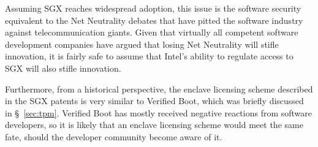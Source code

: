 Assuming SGX reaches widespread adoption, this issue is the software security
equivalent to the Net Neutrality debates that have pitted the software industry
against telecommunication giants. Given that virtually all competent software
development companies have argued that losing Net Neutrality will stifle
innovation, it is fairly safe to assume that Intel's ability to regulate access
to SGX will also stifle innovation.

Furthermore, from a historical perspective, the enclave licensing scheme
described in the SGX patents is very similar to Verified Boot, which was
briefly discussed in \S~\ref{sec:tpm}. Verified Boot has mostly received
negative reactions from software developers, so it is likely that an enclave
licensing scheme would meet the same fate, should the developer community
become aware of it.
